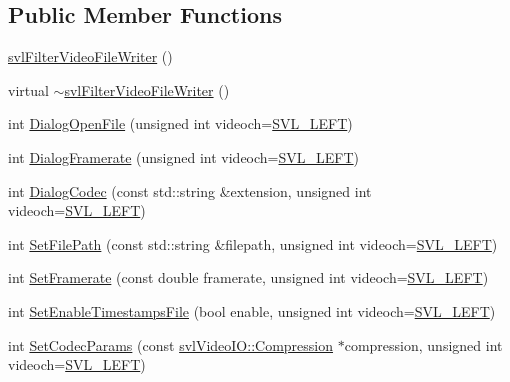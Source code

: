 \subsection*{Public Member Functions}
\begin{DoxyCompactItemize}
\item 
\hyperlink{classsvl_filter_video_file_writer_a7cb8c3711718de9ffd602f81065f6e5c}{svl\+Filter\+Video\+File\+Writer} ()
\item 
virtual \hyperlink{classsvl_filter_video_file_writer_ab542ac7e2964917731fb5f7a81c51784}{$\sim$svl\+Filter\+Video\+File\+Writer} ()
\item 
int \hyperlink{classsvl_filter_video_file_writer_a645354ebe26075c536c40d96a21d0b57}{Dialog\+Open\+File} (unsigned int videoch=\hyperlink{svl_definitions_8h_ab9fec7615f19c8df2919eebcab0b187f}{S\+V\+L\+\_\+\+L\+E\+F\+T})
\item 
int \hyperlink{classsvl_filter_video_file_writer_ab2402531da4b90c86d02909b09490c11}{Dialog\+Framerate} (unsigned int videoch=\hyperlink{svl_definitions_8h_ab9fec7615f19c8df2919eebcab0b187f}{S\+V\+L\+\_\+\+L\+E\+F\+T})
\item 
int \hyperlink{classsvl_filter_video_file_writer_ac5ac1ec7510b3cbb6ee68cc1001f03cb}{Dialog\+Codec} (const std\+::string \&extension, unsigned int videoch=\hyperlink{svl_definitions_8h_ab9fec7615f19c8df2919eebcab0b187f}{S\+V\+L\+\_\+\+L\+E\+F\+T})
\item 
int \hyperlink{classsvl_filter_video_file_writer_aac4ce3a343f6854736bcd01c3a25932c}{Set\+File\+Path} (const std\+::string \&filepath, unsigned int videoch=\hyperlink{svl_definitions_8h_ab9fec7615f19c8df2919eebcab0b187f}{S\+V\+L\+\_\+\+L\+E\+F\+T})
\item 
int \hyperlink{classsvl_filter_video_file_writer_a5a923dacfa6b410d89b2cb953cbd77fe}{Set\+Framerate} (const double framerate, unsigned int videoch=\hyperlink{svl_definitions_8h_ab9fec7615f19c8df2919eebcab0b187f}{S\+V\+L\+\_\+\+L\+E\+F\+T})
\item 
int \hyperlink{classsvl_filter_video_file_writer_a371997677225a6f91225f62208931dc7}{Set\+Enable\+Timestamps\+File} (bool enable, unsigned int videoch=\hyperlink{svl_definitions_8h_ab9fec7615f19c8df2919eebcab0b187f}{S\+V\+L\+\_\+\+L\+E\+F\+T})
\item 
int \hyperlink{classsvl_filter_video_file_writer_a0828bbb3806a4fd2d03fe21f612b50e3}{Set\+Codec\+Params} (const \hyperlink{classsvl_video_i_o_a932d071ec9be4fefde824ab9b9125282}{svl\+Video\+I\+O\+::\+Compression} $\ast$compression, unsigned int videoch=\hyperlink{svl_definitions_8h_ab9fec7615f19c8df2919eebcab0b187f}{S\+V\+L\+\_\+\+L\+E\+F\+T})

\end{DoxyCompactItemize}
